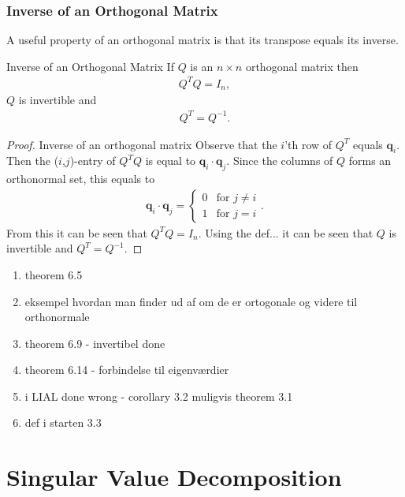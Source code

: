 \subsubsection{Inverse of an Orthogonal Matrix}
A useful property of an orthogonal matrix is that its transpose equals its inverse.
\begin{theorem}{Inverse of an Orthogonal Matrix}
    If $Q$ is an $n\times n$ orthogonal matrix then
    \begin{align*}
        Q^T Q = I_n,
    \end{align*}
    $Q$ is invertible and
    \begin{align*}
        Q^T = Q^{-1}.
    \end{align*}
    \cite[413]{LiAl}
\end{theorem}
\begin{proof}{Inverse of an orthogonal matrix} 
    Observe that the $i$'th row of $Q^T$ equals $\textbf{q}_i$. Then the ($i$,$j$)-entry of $Q^TQ$ is equal to $\textbf{q}_i\cdot\textbf{q}_j$. Since the columns of $Q$ forms an orthonormal set, this equals to
    \begin{align*}
        \textbf{q}_i\cdot\textbf{q}_j= \left\{
    \begin{array}{ll}
          0 & \text{for } j\neq i\\
          1 & \text{for } j= i
    \end{array}
    \right. .
    \end{align*}
    From this it can be seen that $Q^TQ=I_n$. Using the def... it can be seen that $Q$ is invertible and $Q^T=Q^{-1}$.
    \qedsymbol 
\end{proof}


\begin{enumerate}
    \item theorem 6.5
    \item eksempel hvordan man finder ud af om de er ortogonale og videre til orthonormale
    \item theorem 6.9 - invertibel done
    \item theorem 6.14 - forbindelse til eigenværdier
    \item i LIAL done wrong - corollary 3.2 muligvis theorem 3.1
    \item def i starten 3.3
\end{enumerate}

\section{Singular Value Decomposition}